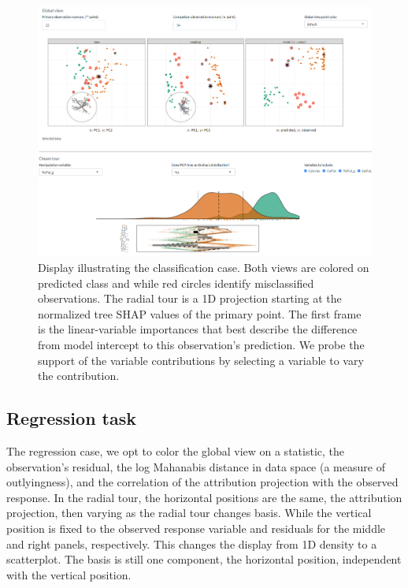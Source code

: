 \documentclass[
  article]{article}
\begin{document}
\begin{figure}

{\centering \includegraphics[width=1\linewidth]{./figures/app_classification} 

}

\caption{Display illustrating the classification case. Both views are colored on predicted class and while red circles identify misclassified observations. The radial tour is a 1D projection starting at the normalized tree SHAP values of the primary point. The first frame is the linear-variable importances that best describe the difference from model intercept to this observation's prediction. We probe the support of the variable contributions by selecting a variable to vary the contribution.}\label{fig:classificationcase}
\end{figure}

\hypertarget{regression-task}{%
\subsection{Regression task}\label{regression-task}}

The regression case, we opt to color the global view on a statistic, the observation's residual, the log Mahanabis distance in data space (a measure of outlyingness), and the correlation of the attribution projection with the observed response. In the radial tour, the horizontal positions are the same, the attribution projection, then varying as the radial tour changes basis. While the vertical position is fixed to the observed response variable and residuals for the middle and right panels, respectively. This changes the display from 1D density to a scatterplot. The basis is still one component, the horizontal position, independent with the vertical position.
\end{document}
